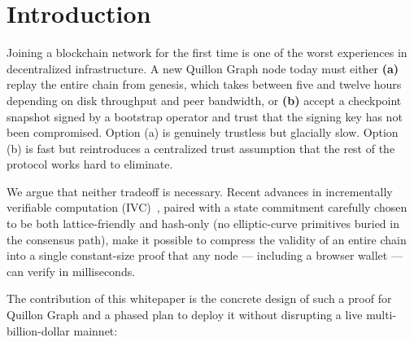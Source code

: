 \documentclass[11pt,a4paper]{article}
\begin{document}
\section{Introduction}
\label{sec:intro}

Joining a blockchain network for the first time is one of the worst experiences in
decentralized infrastructure. A new Quillon Graph node today must either
\textbf{(a)} replay the entire chain from genesis, which takes between five and
twelve hours depending on disk throughput and peer bandwidth, or \textbf{(b)} accept
a checkpoint snapshot signed by a bootstrap operator and trust that the signing key
has not been compromised. Option (a) is genuinely trustless but glacially slow.
Option (b) is fast but reintroduces a centralized trust assumption that the rest of
the protocol works hard to eliminate.

We argue that neither tradeoff is necessary. Recent advances in incrementally
verifiable computation (IVC)~\cite{Valiant2008,KothapalliSettyTzialla2021}, paired
with a state commitment carefully chosen to be both lattice-friendly and
hash-only (no elliptic-curve primitives buried in the consensus path),
make it possible to compress the validity of an entire chain into a single
constant-size proof that any node --- including a browser wallet --- can verify in
milliseconds.

The contribution of this whitepaper is the concrete design of such a proof for
Quillon Graph and a phased plan to deploy it without disrupting a live
multi-billion-dollar mainnet:
\end{document}
